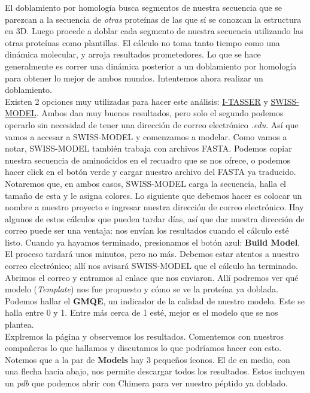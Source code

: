 \documentclass[10pt,letterpaper]{article}
\begin{document}
El doblamiento por homolog\'ia busca segmentos de nuestra secuencia que se parezcan a la secuencia de \emph{otras} prote\'inas de las que s\'i se conozcan la estructura en 3D. Luego procede a doblar cada segmento de nuestra secuencia utilizando las otras prote\'inas como plantillas. El c\'alculo no toma tanto tiempo como una din\'amica molecular, y arroja resultados prometedores. Lo que se hace generalmente es correr una din\'amica posterior a un doblamiento por homolog\'ia para obtener lo mejor de ambos mundos. Intentemos ahora realizar un doblamiento.\\

Existen 2 opciones muy utilizadas para hacer este an\'alisis: \href{http://zhanglab.ccmb.med.umich.edu/I-TASSER/}{I-TASSER} y \href{https://swissmodel.expasy.org/}{SWISS-MODEL}. Ambos dan muy buenos resultados, pero solo el segundo podemos operarlo sin necesidad de tener una direcci\'on de correo electr\'onico \textit{.edu}. As\'i que vamos a accesar a SWISS-MODEL y comenzamos a modelar. Como vamos a notar, SWISS-MODEL tambi\'en trabaja con archivos FASTA. Podemos copiar nuestra secuencia de amino\'acidos en el recuadro que se nos ofrece, o podemos hacer click en el bot\'on verde y cargar nuestro archivo del FASTA ya traducido. Notaremos que, en ambos casos, SWISS-MODEL carga la secuencia, halla el tama\~no de esta y le asigna colores. Lo siguiente que debemos hacer es colocar un nombre a nuestro proyecto e ingresar nuestra direcci\'on de correo electr\'onico. Hay algunos de estos c\'alculos que pueden tardar d\'ias, as\'i que dar nuestra direcci\'on de correo puede ser una ventaja: nos env\'ian los resultados cuando el c\'alculo est\'e listo. Cuando ya hayamos terminado, presionamos el bot\'on azul: \textbf{Build Model}.\\

El proceso tardar\'a unos minutos, pero no m\'as. Debemos estar atentos a nuestro correo electr\'onico; all\'i nos avisar\'a SWISS-MODEL que el c\'alculo ha terminado. Abrimos el correo y entramos al enlace que nos enviaron. All\'i podremos ver qu\'e modelo (\emph{Template}) nos fue propuesto y c\'omo se ve la prote\'ina ya doblada. Podemos hallar el \textbf{GMQE}, un indicador de la calidad de nuestro modelo. Este se halla entre 0 y 1. Entre m\'as cerca de 1 est\'e, mejor es el modelo que se nos plantea.\\

Explremos la p\'agina y observemos los resultados. Comentemos con nuestros compa\~neros lo que hallamos y discutamos lo que podr\'iamos hacer con esto. Notemos que a la par de \textbf{Models} hay 3 peque\~nos \'iconos. El de en medio, con una flecha hacia abajo, nos permite descargar todos los resultados. Estos incluyen un \textit{pdb} que podemos abrir con Chimera para ver nuestro p\'eptido ya doblado.\\
\end{document}
